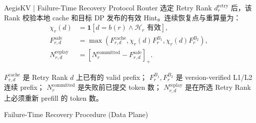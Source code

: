\begin{frame}{AegisKV | Failure-Time Recovery Protocol}
  \small
  Router 选定 Retry Rank $d_r^{\mathrm{retry}}$ 后，该 Rank 校验本地 cache
  和目标 DP 发布的有效 Hint。连续恢复点与重算量为：
  \begin{equation}
    \begin{aligned}
      \chi_r(d)
        &=\mathbf 1[d=b(r)\land\mathcal H_r\text{ 有效}],\\
      F_{r,d}^{\mathrm{safe}}
        &=\max\!\left(
          F_{r,d}^{\mathrm{cache}},
          \chi_r(d)F_r^{B_1},
          \chi_r(d)F_r^{B_2}
        \right),\\
      N_{r,d}^{\mathrm{replay}}
        &=\left[N_r^{\mathrm{committed}}-F_{r,d}^{\mathrm{safe}}\right]_+.
    \end{aligned}
    \label{eq:safe-frontier}
  \end{equation}

  \scriptsize
  $F_{r,d}^{\mathrm{cache}}$ 是 Retry Rank $d$ 上已有的 valid prefix；
  $F_r^{B_1},F_r^{B_2}$ 是 version-verified L1/L2 连续 prefix；
  $N_r^{\mathrm{committed}}$ 是失败前已提交 token 数；
  $N_{r,d}^{\mathrm{replay}}$ 是在所选 Retry Rank 上必须重新 prefill 的 token 数。

  \vspace{0.08cm}
  \begin{paperalgo}{Failure-Time Recovery Procedure (Data Plane)}
  \end{paperalgo}
\end{frame}

